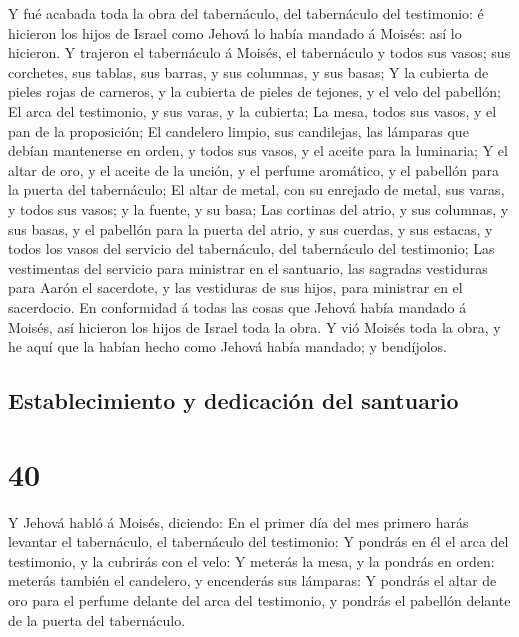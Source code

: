  Y fué acabada toda la obra del tabernáculo, del
tabernáculo del testimonio: é hicieron los hijos de Israel como Jehová
lo había mandado á Moisés: así lo hicieron.  Y trajeron
el tabernáculo á Moisés, el tabernáculo y todos sus vasos; sus
corchetes, sus tablas, sus barras, y sus columnas, y sus basas;
 Y la cubierta de pieles rojas de carneros, y la cubierta
de pieles de tejones, y el velo del pabellón;  El arca
del testimonio, y sus varas, y la cubierta;  La mesa,
todos sus vasos, y el pan de la proposición;  El
candelero limpio, sus candilejas, las lámparas que debían mantenerse en
orden, y todos sus vasos, y el aceite para la luminaria; 
Y el altar de oro, y el aceite de la unción, y el perfume aromático, y
el pabellón para la puerta del tabernáculo;  El altar de
metal, con su enrejado de metal, sus varas, y todos sus vasos; y la
fuente, y su basa;  Las cortinas del atrio, y sus
columnas, y sus basas, y el pabellón para la puerta del atrio, y sus
cuerdas, y sus estacas, y todos los vasos del servicio del tabernáculo,
del tabernáculo del testimonio;  Las vestimentas del
servicio para ministrar en el santuario, las sagradas vestiduras para
Aarón el sacerdote, y las vestiduras de sus hijos, para ministrar en el
sacerdocio.  En conformidad á todas las cosas que Jehová
había mandado á Moisés, así hicieron los hijos de Israel toda la obra.
 Y vió Moisés toda la obra, y he aquí que la habían hecho
como Jehová había mandado; y bendíjolos.

\hypertarget{establecimiento-y-dedicaciuxf3n-del-santuario}{%
\subsection{Establecimiento y dedicación del
santuario}\label{establecimiento-y-dedicaciuxf3n-del-santuario}}

\hypertarget{section-02-40}{%
\section{40}\label{section-02-40}}

 Y Jehová habló á Moisés, diciendo:  En el
primer día del mes primero harás levantar el tabernáculo, el tabernáculo
del testimonio:  Y pondrás en él el arca del testimonio, y
la cubrirás con el velo:  Y meterás la mesa, y la pondrás
en orden: meterás también el candelero, y encenderás sus lámparas:
 Y pondrás el altar de oro para el perfume delante del
arca del testimonio, y pondrás el pabellón delante de la puerta del
tabernáculo.


